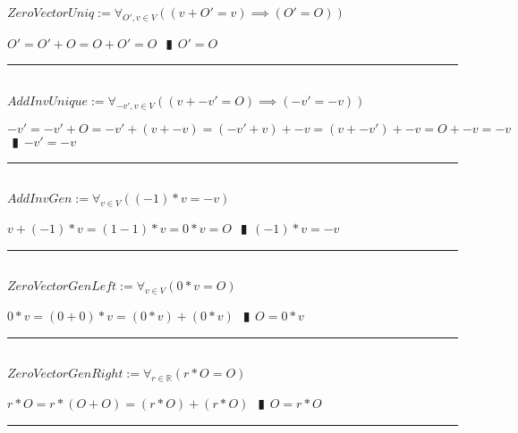 \documentclass{book}
\newcommand{\abr}{:=}
\newcommand{\pipe}{$\phantom{(}\vrectangleblack\phantom{)}$}
\begin{document}
$ZeroVectorUniq \abr \forall_{O', v \in V}((v + O' = v) \implies (O' = O))$
\begin{enumerate}
  \lit $O' = O' + O = O + O' = O$ \pipe $O' = O$
\end{enumerate} \vspace{.75mm} \hrule \vspace{.75mm} \ \\ 

$AddInvUnique \abr \forall_{-v', v \in V}((v + -v' = O) \implies (-v' = -v))$
\begin{enumerate}
  \lit $-v' = -v' + O = -v' + (v + -v) = (-v' + v) + -v = (v + -v') + -v = O + -v = -v$ \pipe $-v' = -v$
\end{enumerate} \vspace{.75mm} \hrule \vspace{.75mm} \ \\ 

$AddInvGen \abr \forall_{v \in V}((-1) * v = -v)$
\begin{enumerate}
  \lit $v + (-1) * v = (1 - 1) * v = 0 * v = O$ \pipe $(-1) * v = -v$
\end{enumerate} \vspace{.75mm} \hrule \vspace{.75mm} \ \\ 

$ZeroVectorGenLeft \abr \forall_{v \in V}(0 * v = O)$
\begin{enumerate}
  \lit $0 * v = (0 + 0) * v = (0 * v) + (0 * v)$ \pipe $O = 0 * v$
\end{enumerate} \vspace{.75mm} \hrule \vspace{.75mm} \ \\ 

$ZeroVectorGenRight \abr \forall_{r \in \mathbb{R}}(r * O = O)$
\begin{enumerate}
  \lit $r * O = r * (O + O) = (r * O) + (r * O)$ \pipe $O = r * O$
\end{enumerate} \vspace{.75mm} \hrule \vspace{.75mm} \ \\ 
\end{document}
